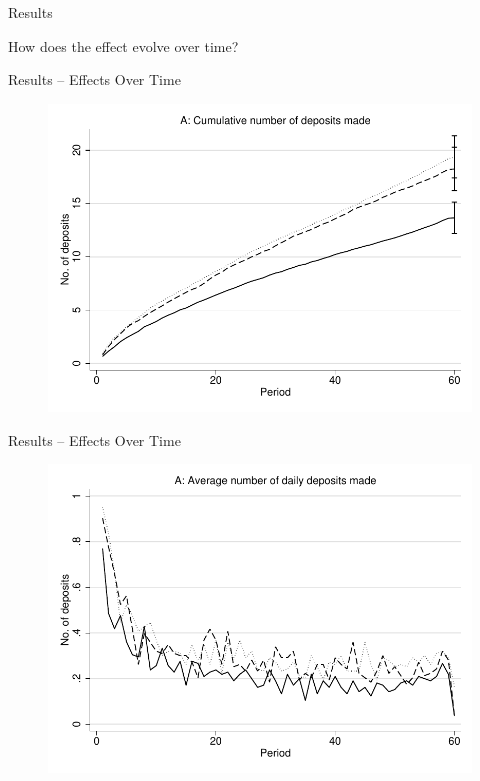 \documentclass[aspectratio=169]{beamer}
\begin{document}



\begin{frame}{Results}
	
	\centering \large How does the effect evolve over time?

\end{frame}

\begin{frame}{Results -- Effects Over Time}

	\begin{figure}[H]
		\centering
		\includegraphics[height=0.8\textheight]{line-mobile_cumdeposits.pdf}
	\end{figure}

\end{frame}

\begin{frame}{Results -- Effects Over Time}

	\begin{figure}[H]
		\centering
		\includegraphics[height=0.8\textheight]{line-mobile_deposits.pdf}
	\end{figure}

\end{frame}
\end{document}
